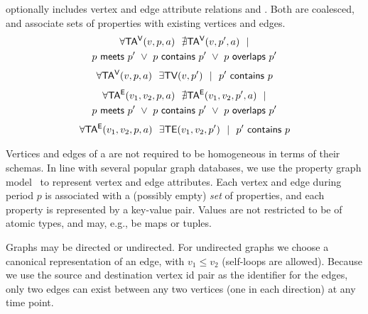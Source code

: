 \begin{definition}
\tve optionally includes vertex and edge attribute relations \tav
and \tae.  Both are coalesced, and associate sets of properties with
existing vertices and edges.
\vspace{-0.3cm}
\begin{multline}
\forall \mathsf{TA^{V}}(v, p, a)~~\nexists \mathsf{TA^{V}}(v, p', a)~~| \\
                       p~\mathsf{meets}~p'~\lor~p~\mathsf{contains}~p'~\lor~p~\mathsf{overlaps}~p'
\label{def:tg:c4}
\end{multline}
\vspace{-0.5cm}
\begin{multline}
\forall \mathsf{TA^{V}}(v, p, a)~~\exists \textsf{TV}(v,p')~~|~~p'~\mathsf{contains}~p
\label{def:tg:c5}
\end{multline}
\vspace{-0.5cm}
\begin{multline}
\forall \mathsf{TA^{E}}(v_1, v_2, p, a)~~\nexists \mathsf{TA^{E}}(v_1, v_2, p', a)~~| \\
                       p~\mathsf{meets}~p'~\lor~p~\mathsf{contains}~p'~\lor~p~\mathsf{overlaps}~p'
\label{def:tg:c6}
\end{multline}
\vspace{-0.5cm}
\begin{multline}
\forall \mathsf{TA^{E}}(v_1, v_2, p, a)~~\exists \textsf{TE}(v_1,v_2,p')~~|~~p'~\mathsf{contains}~p
\label{def:tg:c7}
\end{multline}
\vspace{-0.6cm}
\label{def:tg}
\end{definition}
\vspace{-0.3cm}

Vertices and edges of a \tg are not required to be homogeneous in
terms of their schemas.  In line with several popular graph databases,
we use the property graph model~\cite{GraphDB} to represent vertex and
edge attributes.  Each vertex and edge during period $p$ is
associated with a (possibly empty) {\em set} of properties, and each
property is represented by a key-value pair.  Values are not
restricted to be of atomic types, and may, e.g., be maps or tuples.

Graphs may be directed or undirected.  For undirected graphs we choose
a canonical representation of an edge, with $v_1 \leq v_2$ (self-loops
are allowed).  Because we use the source and destination vertex id
pair as the identifier for the edges, only two edges can exist between
any two vertices (one in each direction) at any time point.

